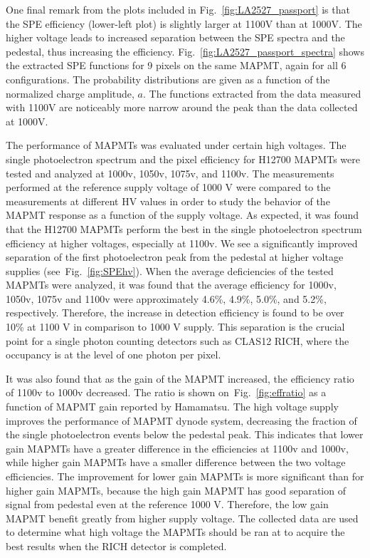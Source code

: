One final remark from the plots included in Fig.~\ref{fig:LA2527_passport} is that the SPE efficiency (lower-left plot) is slightly larger at 1100V than at 1000V. The higher voltage leads to increased separation between the SPE spectra and the pedestal, thus increasing the efficiency. 
Fig.~\ref{fig:LA2527_passport_spectra} shows the extracted SPE functions for 9 pixels on the same MAPMT, again for all 6 configurations. The probability distributions are given as a function of the normalized charge amplitude, $a$. The functions extracted from the data measured with 1100V are noticeably more narrow around the peak than the data collected at 1000V.


\iffalse
The performance of MAPMTs was evaluated under certain high voltages.
The single photoelectron spectrum and the pixel efficiency for H12700 MAPMTs were tested and analyzed at 1000v, 1050v, 1075v, and 1100v.
The measurements performed at the reference supply voltage of 1000 V were compared to the measurements at different HV values in order to study the behavior of the MAPMT response as a function of the supply voltage.
As expected, it was found that the H12700 MAPMTs perform the best in the single photoelectron spectrum efficiency at higher voltages, especially at 1100v.
We see a significantly improved separation of the first photoelectron peak from the pedestal at higher voltage supplies (see~Fig.~\ref{fig:SPEhv}).
When the average deficiencies of the tested MAPMTs were analyzed, it was found that the average efficiency for 1000v, 1050v, 1075v and 1100v were approximately 4.6\%, 4.9\%, 5.0\%, and 5.2\%, respectively.
Therefore, the increase in detection efficiency is found to be over 10\% at 1100 V in comparison to 1000 V supply.
This separation is the crucial point for a single photon counting detectors such as CLAS12 RICH, where the occupancy is at the level of one photon per pixel.



It was also found that as the gain of the MAPMT increased, the efficiency ratio of 1100v to 1000v decreased.
The ratio is shown on~Fig.~\ref{fig:effratio} as a function of MAPMT gain reported by Hamamatsu.
The high voltage supply improves the performance of MAPMT dynode system, decreasing the fraction of the single photoelectron events below the pedestal peak.
This indicates that lower gain MAPMTs have a greater difference in the efficiencies at 1100v and 1000v, while higher gain MAPMTs have a smaller difference between the two voltage efficiencies.
The improvement for lower gain MAPMTs is more significant than for higher gain MAPMTs, because the high gain MAPMT has good separation of signal from pedestal even at the reference 1000 V.
Therefore, the low gain MAPMT benefit greatly from higher supply voltage.
The collected data are used to determine what high voltage the MAPMTs should be ran at to acquire the best results when the RICH detector is completed.


